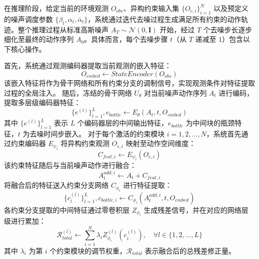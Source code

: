 在推理阶段，给定当前的环境观测 $O_{obs}$、异构约束输入集 $\{O_{c,i}\}_{i=1}^{N}$ 以及预定义的噪声调度参数 $\{\beta_{t}, \alpha_{t}, \bar{\alpha}_{t}\}$，系统通过迭代去噪过程生成满足所有约束的动作轨迹。整个推理过程从标准高斯噪声 $A_{T} \sim \mathcal{N}(0, \mathbf{I})$ 开始，经过 $T$ 个去噪步长逐步细化至最终的动作序列 $A_{0}$。具体而言，每个去噪步骤 $t$（从 $T$ 递减至 $1$）包含以下核心操作。

首先，系统通过观测编码器提取当前观测的嵌入特征：
\begin{equation}
O_{embed} \leftarrow StateEncoder(O_{obs})
\end{equation}
该嵌入特征将作为骨干网络和所有约束分支的调制信号，实现观测条件对特征提取过程的全局注入。
随后，冻结的骨干网络 $U_{\theta}$ 对当前噪声动作序列 $A_{t}$ 进行编码，提取多层级编码器特征：
\begin{equation}
\{e^{(l)}\}_{l=1}^{L}, e_{bottle} \leftarrow E_{\theta}(A_{t}, t, O_{embed})
\end{equation}
其中 $\{e^{(l)}\}_{l=1}^{L}$ 表示 $L$ 个编码器层的中间输出特征，$e_{bottle}$ 为中间块的瓶颈特征，$t$ 为去噪时间步嵌入。
对于每个激活的约束模块 $i = 1, 2, \ldots, N$，系统首先通过约束编码器 $E_{\psi_{i}}$ 将异构约束观测 $O_{c,i}$ 映射至动作空间维度：
\begin{equation}
C_{feat,i} \leftarrow E_{\psi_{i}}(O_{c,i})
\end{equation}
该约束特征随后与当前噪声动作进行融合：
\begin{equation}
A_{t}^{add,i} \leftarrow A_{t} + C_{feat,i}
\end{equation}
将融合后的特征送入约束分支网络 $C_{\phi_{i}}$ 进行特征提取：
\begin{equation}
\{c_{i}^{(l)}\}_{l=1}^{L}, c_{bottle,i} \leftarrow C_{\phi_{i}}(A_{t}^{add,i}, t, O_{embed})
\end{equation}
各约束分支提取的中间特征通过零卷积层 $Z_{\phi_{i}}$ 生成残差信号，并在对应的网络层级进行累加：
\begin{equation}
\mathcal{R}_{total}^{(l)} \leftarrow \sum_{i=1}^{N} \lambda_{i} Z_{\phi_{i}}^{(l)}(c_{i}^{(l)}), \quad \forall l \in \{1, 2, \ldots, L\}
\end{equation}
其中 $\lambda_{i}$ 为第 $i$ 个约束模块的调节权重，$\mathcal{R}_{total}$ 表示融合后的总残差修正量。

